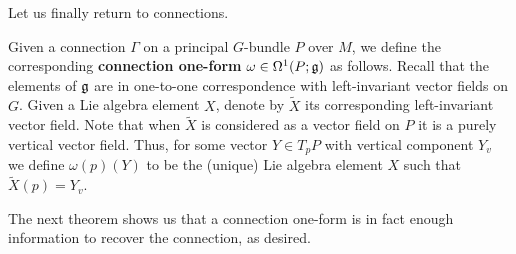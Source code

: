 Let us finally return to connections.
\begin{defn}
    Given a connection $\Gamma$ on a principal $G$-bundle $P$ over $M$, we define the corresponding \textbf{connection one-form} $\omega\in \Omega^1(P;\mathfrak g)$
    as follows. Recall that the elements of $\mathfrak g$ are in one-to-one correspondence with left-invariant vector fields on $G$. Given a Lie algebra
    element $X$, denote by $\tilde X$ its corresponding left-invariant vector field. Note that when $\tilde X$ is considered
    as a vector field on $P$ it is a purely vertical vector field. Thus, for some vector $Y\in T_pP$ with vertical component $Y_v$ we define
    $\omega(p)(Y)$ to be the (unique) Lie algebra element $X$ such that $\tilde X(p)=Y_v$.
\end{defn}

The next theorem shows us that a connection one-form is in fact enough information to recover the connection, as desired.

